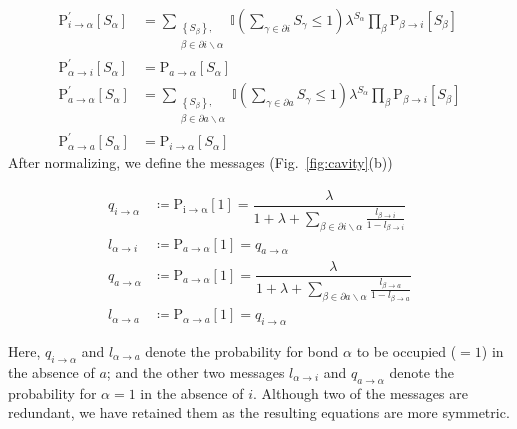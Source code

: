 \documentclass[aps,pra,twocolumn,superscriptaddress,amsmath]{revtex4-1}
\begin{document}
\begin{widetext}

\begin{align}
\mathrm{P}_{i\rightarrow\alpha}^{'}\left[S_{\alpha}\right] & ={\displaystyle \sum_{\substack{\left\{ S_{\beta}\right\} ,\\
\beta\in\partial i\backslash\alpha
}
}\mathbb{I}\left(\sum_{\gamma\in\partial i}S_{\gamma}\leq1\right)\lambda^{S_{\alpha}}{\displaystyle \prod_{\beta}\mathrm{P}_{\beta\rightarrow i}\left[S_{\beta}\right]}}\\
\mathrm{P}_{\alpha\rightarrow i}^{'}\left[S_{\alpha}\right] & =\mathrm{P}_{a\rightarrow\alpha}\left[S_{\alpha}\right]\\
\mathrm{P}_{a\rightarrow\alpha}^{'}\left[S_{\alpha}\right] & =\sum_{\substack{\left\{ S_{\beta}\right\} ,\\
\beta\in\partial a\backslash\alpha
}
}\mathbb{I}\left(\sum_{\gamma\in\partial a}S_{\gamma}\leq1\right)\lambda^{S_{\alpha}}{\displaystyle \prod_{\beta}\mathrm{P}_{\beta\rightarrow i}\left[S_{\beta}\right]}\\
\mathrm{P}_{\alpha\rightarrow a}^{'}\left[S_{\alpha}\right] & =\mathrm{P}_{i\rightarrow\alpha}\left[S_{\alpha}\right]
\end{align}
After normalizing, we define the messages (Fig.~\ref{fig:cavity}(b)) 

\begin{align}
q_{i\rightarrow\alpha} & \coloneqq\mathrm{P_{i\rightarrow\alpha}\left[1\right]=}\dfrac{\lambda}{1+\lambda+{\displaystyle \sum_{\beta\in\partial i\backslash\alpha}\frac{l_{\beta\rightarrow i}}{1-l_{\beta\rightarrow i}}}}\\
l_{\alpha\rightarrow i} & \coloneqq\mathrm{P}_{a\rightarrow\alpha}\left[1\right]=q_{a\rightarrow\alpha}\\
q_{a\rightarrow\alpha} & \coloneqq\mathrm{P}_{a\rightarrow\alpha}\left[1\right]=\dfrac{\lambda}{1+\lambda+{\displaystyle \sum_{\beta\in\partial a\backslash\alpha}\frac{l_{\beta\rightarrow a}}{1-l_{\beta\rightarrow a}}}}\\
l_{\alpha\rightarrow a} & \coloneqq\mathrm{P}_{\alpha\rightarrow a}\left[1\right]=q_{i\rightarrow\alpha}
\end{align}

Here, $q_{i\rightarrow\alpha}$ and $l_{\alpha\rightarrow a}$ denote the probability for bond $\alpha$ to be occupied ($=1$) in the absence of $a$; and the other two messages $l_{\alpha\rightarrow i}$ and $q_{a\rightarrow\alpha}$ denote the probability for $\alpha=1$ in the absence of $i$. Although two of the messages are redundant, we have retained them as the resulting equations are more symmetric.


\end{widetext}
\end{document}
